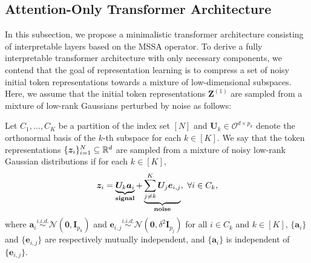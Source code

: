 \documentclass[../../book-main.tex]{subfiles}
\begin{document}




\subsection{Attention-Only Transformer Architecture} \label{sub:aot}

In this subsection, we propose a minimalistic transformer architecture consisting of interpretable layers based on the MSSA operator. To derive a fully interpretable transformer architecture with only necessary components,
we contend that the goal of representation learning is to compress a set of noisy initial token representations towards a mixture of low-dimensional subspaces. %
Here, we assume that the initial token representations $\bm Z^{(1)}$ are sampled from a mixture of low-rank Gaussians perturbed by noise as follows: 
\begin{definition}\label{def:MoG}
Let $C_1,\dots,C_K$ be a partition of the index set $[N]$ and $\bm U_k \in \mathcal{O}^{d \times p_k}$ denote the orthonormal basis of the $k$-th subspace for each $k \in [K]$. We say that the token representations $\{\bm z_i \}_{i=1}^N \subseteq \mathbb{R}^d$ are sampled from a mixture of noisy low-rank Gaussian distributions if for each $k \in [K]$,
\begin{align}\label{eq:MoG}
    \bm z_i = \underbrace{\bm U_{k} \bm a_i}_{\bf signal} + \underbrace{\sum_{j \neq k}^K \bm U_j \bm e_{i,j}}_{\bf noise},\ \forall i \in C_k, 
\end{align}
where $\bm{a}_i \overset{i.i.d.}{\sim} \mathcal{N}(\bm{0},\bm{I}_{p_k})$ and $\bm{e}_{i,j} \overset{i.i.d.}{\sim} \mathcal{N}(\bm{0},\delta^2\bm{I}_{p_j})$ for all $i \in C_k$ and $k \in [K]$, $\{\bm{a}_i\}$ and $\{\bm{e}_{i,j}\}$ are respectively mutually independent, and $\{\bm{a}_i\}$ is independent of $\{\bm{e}_{i,j}\}$.         
\end{definition}
\end{document}
